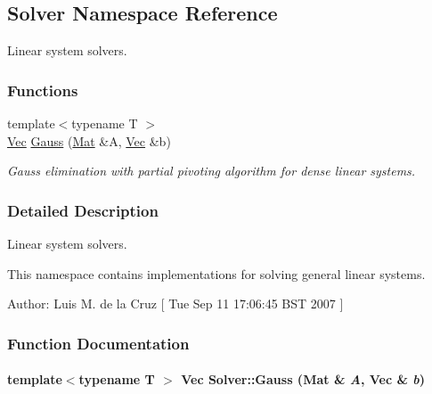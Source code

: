 \hypertarget{namespaceSolver}{
\subsection{Solver Namespace Reference}
\label{namespaceSolver}
}
Linear system solvers.  


\subsubsection*{Functions}
\begin{CompactItemize}
\item 
{\footnotesize template$<$typename T $>$ }\\\hyperlink{Traits_8hpp_327b06345fe9c9ae56c556c92b78272b}{Vec} \hyperlink{namespaceSolver_e7a6d9b74d92a054a16c62b6708d3c88}{Gauss} (\hyperlink{Traits_8hpp_b349a67c16cc4a221c94f5bb1fa77da5}{Mat} \&A, \hyperlink{Traits_8hpp_327b06345fe9c9ae56c556c92b78272b}{Vec} \&b)
\begin{CompactList}\small\item\em Gauss elimination with partial pivoting algorithm for dense linear systems. \item\end{CompactList}\end{CompactItemize}


\subsubsection{Detailed Description}
Linear system solvers. 

This namespace contains implementations for solving general linear systems. \begin{Desc}
\item[Author:]Luis M. de la Cruz \mbox{[} Tue Sep 11 17:06:45 BST 2007 \mbox{]} \end{Desc}




\subsubsection{Function Documentation}
\hypertarget{namespaceSolver_e7a6d9b74d92a054a16c62b6708d3c88}{
\paragraph[{Gauss}]{\setlength{\rightskip}{0pt plus 5cm}template$<$typename T $>$ {\bf Vec} Solver::Gauss ({\bf Mat} \& {\em A}, \/  {\bf Vec} \& {\em b})}\hfill}
\label{namespaceSolver_e7a6d9b74d92a054a16c62b6708d3c88}


